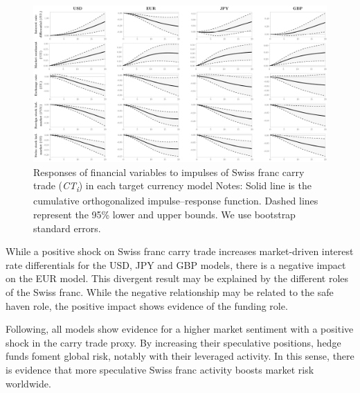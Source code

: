 \documentclass[a4paper, twoside]{templates/ociamthesis}
\begin{document}
\begin{figure}[!ht]

{\centering \includegraphics[width=0.99\columnwidth]{figure/gALL_COIRF20} 

}

\caption[Responses of financial variables to impulses of Swiss franc carry trade (\textit{CT\textsubscript{i}}) in each target currency model]{Responses of financial variables to impulses of Swiss franc carry trade (\textit{CT\textsubscript{i}}) in each target currency model \newline \scriptsize Notes: Solid line is the cumulative orthogonalized impulse–response function. Dashed lines represent the 95\% lower and upper bounds. We use bootstrap standard errors.}\label{fig:Figure42}
\end{figure}

While a positive shock on Swiss franc carry trade increases market-driven interest rate differentials for the USD, JPY and GBP models, there is a negative impact on the EUR model. This divergent result may be explained by the different roles of the Swiss franc. While the negative relationship may be related to the safe haven role, the positive impact shows evidence of the funding role.

Following, all models show evidence for a higher market sentiment with a positive shock in the carry trade proxy. By increasing their speculative positions, hedge funds foment global risk, notably with their leveraged activity. In this sense, there is evidence that more speculative Swiss franc activity boosts market risk worldwide.
\end{document}
